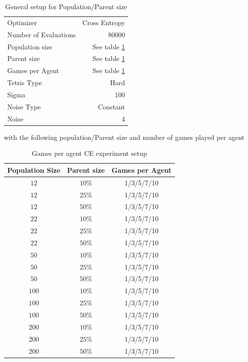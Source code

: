 \begin{table}[h]
\centering
\caption{General setup for Population/Parent size}
\begin{tabular}{l r}
Optimizer & Cross Entropy\\
Number of Evaluations & 80000\\
Population size & See table \ref{GamesPerAgentCE}\\
Parent size & See table \ref{GamesPerAgentCE}\\
Games per Agent & See table \ref{GamesPerAgentCE}\\
Tetris Type & Hard\\
\hline
Sigma & 100\\
Noise Type & Constant\\
Noise & 4
\end{tabular}
\end{table}

with the following population/Parent size and number of games played per agent


\begin{table}[H]
\centering
\begin{tabular}{c c c}
Population Size & Parent size & Games per Agent\\
\hline
$12$ & $10\%$ & 1/3/5/7/10\\
$12$ & $25\%$ & 1/3/5/7/10\\
$12$ & $50\%$ & 1/3/5/7/10\\
$22$ & $10\%$ & 1/3/5/7/10\\
$22$ & $25\%$ & 1/3/5/7/10\\
$22$ & $50\%$ & 1/3/5/7/10\\
$50$ & $10\%$ & 1/3/5/7/10\\
$50$ & $25\%$ & 1/3/5/7/10\\
$50$ & $50\%$ & 1/3/5/7/10\\
$100$ & $10\%$ & 1/3/5/7/10\\
$100$ & $25\%$ & 1/3/5/7/10\\
$100$ & $50\%$ & 1/3/5/7/10\\
$200$ & $10\%$ & 1/3/5/7/10\\
$200$ & $25\%$ & 1/3/5/7/10\\
$200$ & $50\%$ & 1/3/5/7/10
\end{tabular}
\caption{Games per agent CE experiment setup\label{GamesPerAgentCE}}
\end{table}

\clearpage

